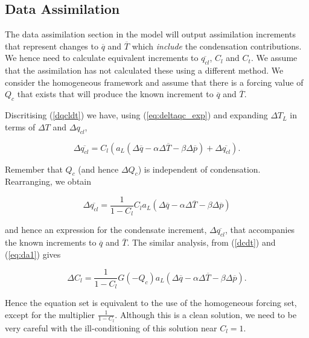 \documentclass{UMDP_article}
\begin{document}
\subsection{Data Assimilation}
\label{sec:da}

The data assimilation section in the model will output assimilation increments
that represent changes to $\overline{q}$ and $\overline{T}$ which
\textit{include} the condensation contributions. We hence need to calculate
equivalent increments to $\overline{q_{cl}}$, $C_l$ and $C_t$. We assume
that the assimilation has not calculated these using a different method.
We consider the homogeneous framework and assume that there is a forcing
value of $Q_c$ that exists that will produce the known increment to
$\overline{q}$ and $\overline{T}$.

Discritising (\ref{dqcldt}) we have, using (\ref{eq:deltaqc_exp}) and
expanding $\Delta T_L$ in terms of $\Delta T$ and $\Delta q_{cl}$,

\begin{equation}
\Delta \overline{q_{cl}} = C_l ( a_L ( \Delta \overline{q} -
\alpha \Delta \overline{T} - \beta \Delta \overline{p}) + \Delta \overline{q_{cl}} ).
\label{eq:da1}
\end{equation}

Remember that $Q_c$ (and hence $\Delta Q_c$) is independent of condensation.
Rearranging, we obtain

\begin{equation}
\Delta \overline{q_{cl}} = \frac{1}{1 - C_l} C_l 
a_L ( \Delta \overline{q} - \alpha \Delta \overline{T} - \beta \Delta \overline{p})
\label{eq:da2}
\end{equation}

and hence an expression for the condensate increment,
$\Delta \overline{q_{cl}}$, that accompanies the known increments
to $\overline{q}$ and $\overline{T}$. The similar analysis, from
(\ref{dcdt}) and (\ref{eq:da1}) gives

\begin{equation}
\Delta C_l = \frac{1}{1 - C_l} G(-Q_c) 
 a_L ( \Delta \overline{q} - \alpha \Delta \overline{T}
- \beta \Delta \overline{p} ) .
\label{eq:da3}
\end{equation}

Hence the equation set is equivalent to the use of the homogeneous
forcing set, except for the multiplier $\frac{1}{1 - C_l}$. Although this
is a clean solution, we
need to be very careful with the ill-conditioning of this solution
near $C_l = 1$.
\end{document}
